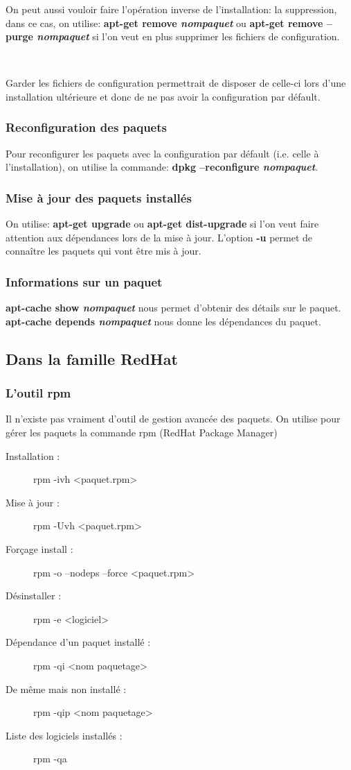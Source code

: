 \documentclass{article}
\newcommand{\Rem}[2]{
\definecolor{shadecolor}{RGB}{135,167,103}
\begin{leftbar}
\begin{shaded}
 \textcolor{white}{\textbf{\textit{\Info  Remarque:}} \textbf{\textit{#1}}}
\end{shaded}
#2
\end{leftbar}
\bigskip
}
\begin{document}
On peut aussi vouloir faire l'opération inverse de l'installation: la suppression, dans ce cas, on utilise: 
\textbf{apt-get remove \textit{nompaquet}} ou \textbf{apt-get remove --purge \textit{nompaquet}} si l'on veut en plus supprimer
les fichiers de configuration. 

\Rem{}{Garder les fichiers de configuration permettrait de disposer de celle-ci lors d'une installation ultérieure et donc de ne pas avoir la
configuration par défault.}

\subsubsection{Reconfiguration des paquets}
Pour reconfigurer les paquets avec la configuration par défault (i.e. celle à l'installation), on utilise la commande: \textbf{dpkg --reconfigure \textit{nompaquet}}.

\subsubsection{Mise à jour des paquets installés}
On utilise: \textbf{apt-get upgrade} ou \textbf{apt-get dist-upgrade} si l'on veut faire attention aux dépendances lors de la mise à jour. L'option \textbf{-u} permet de connaître
les paquets qui vont être mis à jour.

\subsubsection{Informations sur un paquet}

\textbf{apt-cache show \textit{nompaquet}} nous permet d'obtenir des détails sur le paquet.\\

\textbf{apt-cache depends \textit{nompaquet}} nous donne les dépendances du paquet.\\

\subsection{Dans la famille RedHat}
\subsubsection{L'outil rpm}
Il n'existe pas vraiment d'outil de gestion avancée des paquets. On utilise pour gérer les paquets la commande rpm (RedHat Package Manager) \\
\begin{description}
	\item[Installation :]rpm -ivh <paquet.rpm>
	\item[Mise à jour : ] rpm -Uvh <paquet.rpm>
	\item[Forçage install :]rpm -o --nodeps --force <paquet.rpm>
	\item[Désinstaller :] rpm -e <logiciel>
	\item[Dépendance d'un paquet installé :] rpm -qi <nom paquetage>
	\item[De même mais non installé :] rpm -qip <nom paquetage>
	\item[Liste des logiciels installés :] rpm -qa
\end{description}
\end{document}
